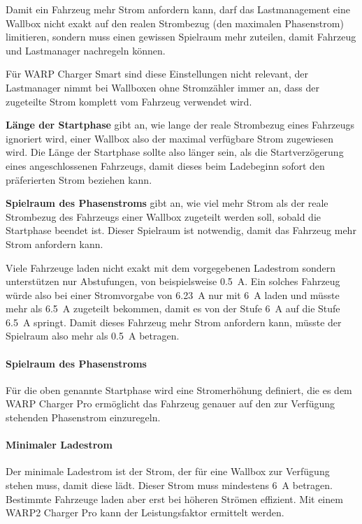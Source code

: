 \documentclass[a4paper,10pt]{article}
\begin{document}
\begin{multicols*}{2}
    Damit ein Fahrzeug mehr Strom anfordern kann, darf das Lastmanagement eine Wallbox nicht exakt
    auf den realen Strombezug (den maximalen Phasenstrom) limitieren, sondern muss einen gewissen Spielraum
    mehr zuteilen, damit Fahrzeug und Lastmanager nachregeln können.

    Für WARP Charger Smart sind diese Einstellungen nicht relevant,
    der Lastmanager nimmt bei Wallboxen ohne Stromzähler immer an, dass der zugeteilte Strom komplett vom Fahrzeug verwendet wird.

    \textbf{Länge der Startphase} gibt an, wie lange der reale Strombezug eines Fahrzeugs ignoriert wird,
    einer Wallbox also der maximal verfügbare Strom zugewiesen wird. Die Länge der Startphase sollte also
    länger sein, als die Startverzögerung eines angeschlossenen Fahrzeugs, damit dieses beim Ladebeginn
    sofort den präferierten Strom beziehen kann.

    \textbf{Spielraum des Phasenstroms} gibt an, wie viel mehr Strom als der reale Strombezug des Fahrzeugs
    einer Wallbox zugeteilt werden soll, sobald die Startphase beendet ist. Dieser Spielraum ist notwendig, damit
    das Fahrzeug mehr Strom anfordern kann.

    Viele Fahrzeuge laden nicht exakt mit dem vorgegebenen Ladestrom sondern unterstützen nur Abstufungen, von beispielsweise \SI{0,5}{\ampere}.
    Ein solches Fahrzeug würde also bei einer Stromvorgabe von \SI{6,23}{\ampere} nur mit \SI{6}{\ampere} laden und müsste mehr als \SI{6,5}{\ampere} zugeteilt bekommen, damit es von der Stufe \SI{6}{\ampere} auf die Stufe \SI{6,5}{\ampere} springt.
    Damit dieses Fahrzeug mehr Strom anfordern kann, müsste der Spielraum also mehr als \SI{0,5}{\ampere} betragen.

    \paragraph{Spielraum des Phasenstroms}
    Für die oben genannte Startphase wird eine Stromerhöhung definiert, die es
    dem WARP Charger Pro ermöglicht das Fahrzeug genauer auf den zur Verfügung
    stehenden Phasenstrom einzuregeln.

    \paragraph{Minimaler Ladestrom}
    Der minimale Ladestrom ist der Strom, der für eine Wallbox zur Verfügung stehen muss, damit diese lädt. Dieser Strom muss mindestens \SI{6}{\ampere} betragen.
    Bestimmte Fahrzeuge laden aber erst bei höheren Strömen effizient. Mit einem WARP2 Charger Pro kann der Leistungsfaktor ermittelt werden.


\end{multicols*}
\end{document}
